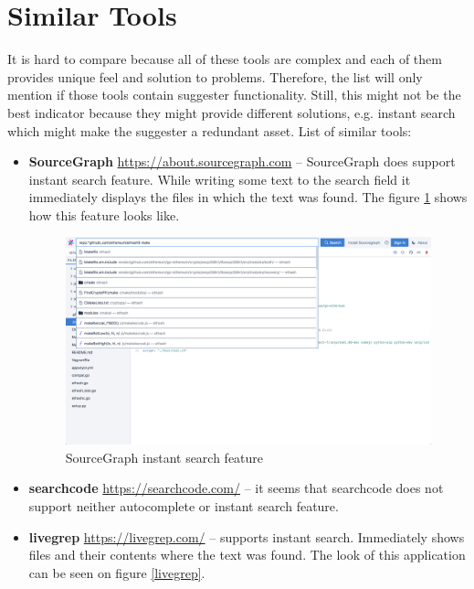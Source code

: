\section{Similar Tools}
It is hard to compare because all of these tools are complex and each of them provides unique feel and solution to problems.
Therefore, the list will only mention if those tools contain suggester functionality. Still, this might not be the best
indicator because they might provide different solutions, e.g. instant search which might make the suggester a redundant asset.
List of similar tools:
\begin{itemize}
    \item \textbf{SourceGraph} \url{https://about.sourcegraph.com} – SourceGraph does support instant search feature.
    While writing some text to the search field it immediately displays the files in which the text was found. The figure
    \ref{sourcegraph} shows how this feature looks like.

    \begin{figure}[htbp]
        \centering
        \includegraphics[width=145mm]{../img/sourcegraph.png}
        \caption{SourceGraph instant search feature}
        \label{sourcegraph}
    \end{figure}

    \item \textbf{searchcode} \url{https://searchcode.com/} – it seems that searchcode does not support neither
    autocomplete or instant search feature.

    \item \textbf{livegrep} \url{https://livegrep.com/} – supports instant search. Immediately shows files and their contents
    where the text was found. The look of this application can be seen on figure \ref{livegrep}.


\end{itemize}
